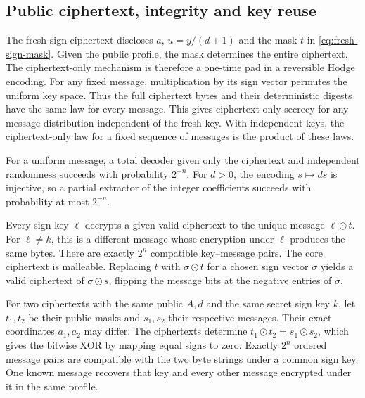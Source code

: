 \subsection{Public ciphertext, integrity and key reuse}
\label{sec:coupled-sign-reuse}

The fresh-sign ciphertext discloses \(a\), \(u=y/(d+1)\) and the mask \(t\)
in \eqref{eq:fresh-sign-mask}. Given the public profile, the mask determines
the entire ciphertext. The ciphertext-only mechanism is therefore a
one-time pad in a reversible Hodge encoding. For any fixed message,
multiplication by its sign vector permutes the uniform key space. Thus the
full ciphertext bytes and their deterministic digests have the same law
for every message. This gives ciphertext-only secrecy for any message
distribution independent of the fresh key. With independent keys, the
ciphertext-only law for a fixed sequence of messages is the product of
these laws.

For a uniform message, a total decoder given only the ciphertext and
independent randomness succeeds with probability \(2^{-n}\). For \(d>0\),
the encoding \(s\mapsto ds\) is injective, so a partial extractor of the
integer coefficients succeeds with probability at most \(2^{-n}\).

Every sign key \(\ell\) decrypts a given valid ciphertext to the unique
message \(\ell\mathbin\odot t\). For \(\ell\ne k\), this is a different
message whose encryption under \(\ell\) produces the same bytes. There are
exactly \(2^n\) compatible key--message pairs. The core ciphertext is
malleable. Replacing \(t\) with \(\sigma\mathbin\odot t\) for a chosen sign
vector \(\sigma\) yields a valid ciphertext of \(\sigma\mathbin\odot s\),
flipping the message bits at the negative entries of \(\sigma\).

\begin{proposition}
\label{prop:coupled-sign-reuse}
For two ciphertexts with the same public \(A,d\) and the same
secret sign key \(k\), let \(t_1,t_2\) be their public masks and \(s_1,s_2\)
their respective messages. Their exact coordinates \(a_1,a_2\) may differ.
The ciphertexts determine \(t_1\mathbin\odot t_2=s_1\mathbin\odot s_2\),
which gives the bitwise XOR by mapping equal signs to zero. Exactly \(2^n\)
ordered message pairs are compatible with the two byte strings under a
common sign key. One known message recovers that key and every other message
encrypted under it in the same profile.
\end{proposition}

